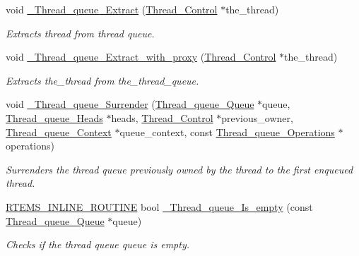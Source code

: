 \begin{DoxyCompactItemize}
void \mbox{\hyperlink{group__RTEMSScoreThreadQueue_gade3d717e5bef36275e5abd5c9cb0795f}{\+\_\+\+Thread\+\_\+queue\+\_\+\+Extract}} (\mbox{\hyperlink{struct__Thread__Control}{Thread\+\_\+\+Control}} $\ast$the\+\_\+thread)
\begin{DoxyCompactList}\small\item\em Extracts thread from thread queue. \end{DoxyCompactList}\item 
void \mbox{\hyperlink{group__RTEMSScoreThreadQueue_ga999731e7674266e35751c1afad5a10b3}{\+\_\+\+Thread\+\_\+queue\+\_\+\+Extract\+\_\+with\+\_\+proxy}} (\mbox{\hyperlink{struct__Thread__Control}{Thread\+\_\+\+Control}} $\ast$the\+\_\+thread)
\begin{DoxyCompactList}\small\item\em Extracts the\+\_\+thread from the\+\_\+thread\+\_\+queue. \end{DoxyCompactList}\item 
void \mbox{\hyperlink{group__RTEMSScoreThreadQueue_ga2f163fd4e89b8ea38e05e2faf4b065cf}{\+\_\+\+Thread\+\_\+queue\+\_\+\+Surrender}} (\mbox{\hyperlink{structThread__queue__Queue}{Thread\+\_\+queue\+\_\+\+Queue}} $\ast$queue, \mbox{\hyperlink{group__RTEMSScoreThreadQueue_gaebac32033b009cc8f606a90bd389f8e9}{Thread\+\_\+queue\+\_\+\+Heads}} $\ast$heads, \mbox{\hyperlink{struct__Thread__Control}{Thread\+\_\+\+Control}} $\ast$previous\+\_\+owner, \mbox{\hyperlink{structThread__queue__Context}{Thread\+\_\+queue\+\_\+\+Context}} $\ast$queue\+\_\+context, const \mbox{\hyperlink{structThread__queue__Operations}{Thread\+\_\+queue\+\_\+\+Operations}} $\ast$operations)
\begin{DoxyCompactList}\small\item\em Surrenders the thread queue previously owned by the thread to the first enqueued thread. \end{DoxyCompactList}\item 
\mbox{\hyperlink{group__RTEMSScoreBaseDefs_gac216239df231d5dbd15e3520b0b9313f}{R\+T\+E\+M\+S\+\_\+\+I\+N\+L\+I\+N\+E\+\_\+\+R\+O\+U\+T\+I\+NE}} bool \mbox{\hyperlink{group__RTEMSScoreThreadQueue_ga35b6fa511ba7c3c55a3afb91cc7b0cfb}{\+\_\+\+Thread\+\_\+queue\+\_\+\+Is\+\_\+empty}} (const \mbox{\hyperlink{structThread__queue__Queue}{Thread\+\_\+queue\+\_\+\+Queue}} $\ast$queue)
\begin{DoxyCompactList}\small\item\em Checks if the thread queue queue is empty. \end{DoxyCompactList}\item 

\end{DoxyCompactItemize}
